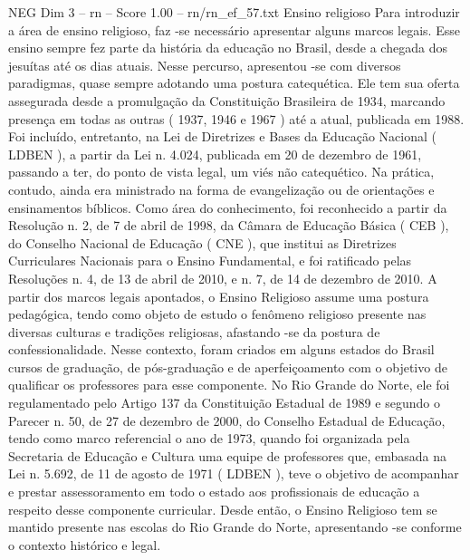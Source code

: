 \begin{textsample}{NEG Dim 3 – rn – Score 1.00 – rn/rn\_ef\_57.txt}  \label{ex:f3_neg_198}
Ensino religioso Para introduzir a área de ensino religioso, faz -se necessário apresentar alguns marcos legais.
Esse ensino sempre fez parte da história da educação no Brasil, desde a chegada dos jesuítas até os dias atuais.
Nesse percurso, apresentou -se com diversos paradigmas, quase sempre adotando uma postura catequética.
Ele tem sua oferta assegurada desde a promulgação da Constituição Brasileira de 1934, marcando presença em todas as outras ( 1937, 1946 e 1967 ) até a atual, publicada em 1988.
Foi incluído, entretanto, na Lei de Diretrizes e Bases da Educação Nacional ( LDBEN ), a partir da Lei n. 4.024, publicada em 20 de dezembro de 1961, passando a ter, do ponto de vista legal, um viés não catequético.
Na prática, contudo, ainda era ministrado na forma de evangelização ou de orientações e ensinamentos bíblicos.
Como área do conhecimento, foi reconhecido a partir da Resolução n. 2, de 7 de abril de 1998, da Câmara de Educação Básica ( CEB ), do Conselho Nacional de Educação ( CNE ), que institui as Diretrizes Curriculares Nacionais para o Ensino Fundamental, e foi ratificado pelas Resoluções n. 4, de 13 de abril de 2010, e n. 7, de 14 de dezembro de 2010.
A partir dos marcos legais apontados, o Ensino Religioso assume uma postura pedagógica, tendo como objeto de estudo o fenômeno religioso presente nas diversas culturas e tradições religiosas, afastando -se da postura de confessionalidade.
Nesse contexto, foram criados em alguns estados do Brasil cursos de graduação, de pós-graduação e de aperfeiçoamento com o objetivo de qualificar os professores para esse componente.
No Rio Grande do Norte, ele foi regulamentado pelo Artigo 137 da Constituição Estadual de 1989 e segundo o Parecer n. 50, de 27 de dezembro de 2000, do Conselho Estadual de Educação, tendo como marco referencial o ano de 1973, quando foi organizada pela Secretaria de Educação e Cultura uma equipe de professores que, embasada na Lei n. 5.692, de 11 de agosto de 1971 ( LDBEN ), teve o objetivo de acompanhar e prestar assessoramento em todo o estado aos profissionais de educação a respeito desse componente curricular.
Desde então, o Ensino Religioso tem se mantido presente nas escolas do Rio Grande do Norte, apresentando -se conforme o contexto histórico e legal.

\end{textsample}
